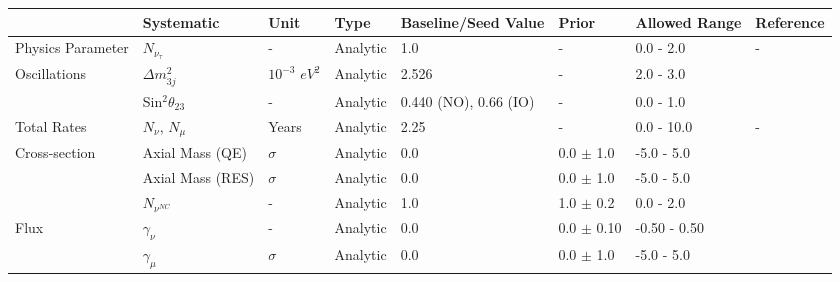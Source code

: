 \begin{landscape}
\begin{table}[]
\centering
\begin{tabular}{@{}llllllll@{}}
\toprule
                               & Systematic                            & Unit                        & Type       & Baseline/Seed Value     & Prior           & Allowed Range & Reference                     \\ \midrule
Physics Parameter    & $N_{\nu_\tau}$                    & -                             & Analytic   & 1.0                     & -                       & 0.0 - 2.0     & -                             \\ \midrule
\multirow{2}{*}{Oscillations}  & $\Delta m^2_{3j}$  & $10^{-3}$ $eV^2$ & Analytic   & 2.526                  & -                      & 2.0 - 3.0     & \cite{NuFit.org}            \\
                               & Sin$^2 \theta_{23}$            & -                             & Analytic   & 0.440 (NO), 0.66 (IO)   & -              & 0.0 - 1.0     & \cite{NuFit.org}             \\ \midrule
Total Rates              & $N_\nu$, $N_\mu$              & Years                      & Analytic   & 2.25                    & -                      & 0.0 - 10.0    & -                             \\ \midrule
\multirow{3}{*}{Cross-section} & Axial Mass (QE)     & $\sigma$                & Analytic   & 0.0                     & 0.0 $\pm$ 1.0   & -5.0 - 5.0    & \cite{GENIE}             \\
                               & Axial Mass (RES)                    & $\sigma$               & Analytic   & 0.0                     & 0.0 $\pm$ 1.0   & -5.0 - 5.0    & \cite{GENIE}             \\
                               & $N_{\nu^{NC}}$                   & -                            & Analytic   & 1.0                     & 1.0 $\pm$ 0.2   & 0.0 - 2.0     & \cite{IceCube-Oscillation2018}          \\ \midrule
\multirow{6}{*}{Flux}& $\gamma_\nu$                    & -                            & Analytic   & 0.0                     & 0.0 $\pm$ 0.10  & -0.50 - 0.50  & \cite{Honda-2015}         \\
                               & $\gamma_\mu$                   & $\sigma$                & Analytic   & 0.0                     & 0.0 $\pm$ 1.0   & -5.0 - 5.0    & \cite{NuFlux-Manchester}                \\

\end{tabular}
\end{table}
\end{landscape}
